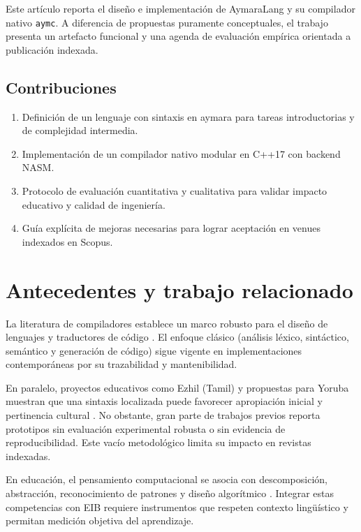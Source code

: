 \documentclass[11pt,a4paper]{article}
\begin{document}
Este art\'iculo reporta el dise\~no e implementaci\'on de AymaraLang y su compilador nativo \texttt{aymc}. A diferencia de propuestas puramente conceptuales, el trabajo presenta un artefacto funcional y una agenda de evaluaci\'on emp\'irica orientada a publicaci\'on indexada.

\subsection*{Contribuciones}
\begin{enumerate}[leftmargin=*,itemsep=2pt]
  \item Definici\'on de un lenguaje con sintaxis en aymara para tareas introductorias y de complejidad intermedia.
  \item Implementaci\'on de un compilador nativo modular en C++17 con backend NASM.
  \item Protocolo de evaluaci\'on cuantitativa y cualitativa para validar impacto educativo y calidad de ingenier\'ia.
  \item Gu\'ia expl\'icita de mejoras necesarias para lograr aceptaci\'on en venues indexados en Scopus.
\end{enumerate}

\section{Antecedentes y trabajo relacionado}
La literatura de compiladores establece un marco robusto para el dise\~no de lenguajes y traductores de c\'odigo \cite{aho2006}. El enfoque cl\'asico (an\'alisis l\'exico, sint\'actico, sem\'antico y generaci\'on de c\'odigo) sigue vigente en implementaciones contempor\'aneas por su trazabilidad y mantenibilidad.

En paralelo, proyectos educativos como Ezhil (Tamil) y propuestas para Yoruba muestran que una sintaxis localizada puede favorecer apropiaci\'on inicial y pertinencia cultural \cite{ezhil2009}. No obstante, gran parte de trabajos previos reporta prototipos sin evaluaci\'on experimental robusta o sin evidencia de reproducibilidad. Este vac\'io metodol\'ogico limita su impacto en revistas indexadas.

En educaci\'on, el pensamiento computacional se asocia con descomposici\'on, abstracci\'on, reconocimiento de patrones y dise\~no algor\'itmico \cite{wing2006,brennan2012,rojas2023}. Integrar estas competencias con EIB requiere instrumentos que respeten contexto ling\"u\'istico y permitan medici\'on objetiva del aprendizaje.
\end{document}
